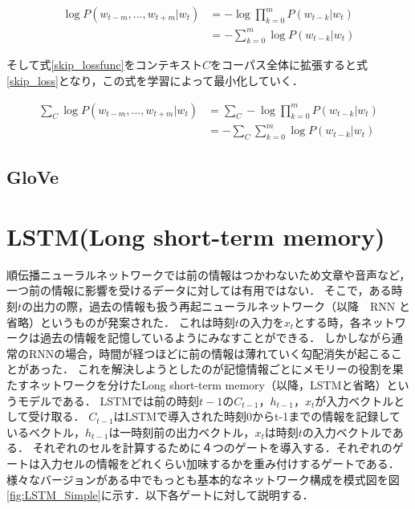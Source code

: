 \documentclass[a4j,11pt,report]{jsbook}
\begin{document}
\begin{equation}
  \label{skip_lossfunc}
  \begin{split}
    \log P(w_{t-m},...,w_{t+m}|w_{t} ) &= -\log \prod_{k = 0}^m P(w_{t-k}|w_{t})   \\
    &= - \sum_{k = 0}^m \log P(w_{t-k} | w_{t})
  \end{split}
\end{equation}

そして式\ref{skip_lossfunc}をコンテキスト$C$をコーパス全体に拡張すると式\ref{skip_loss}となり，この式を学習によって最小化していく．

\begin{equation}
  \label{skip_loss}
  \begin{split}
    \sum_{C} \log P(w_{t-m},...,w_{t+m}|w_{t} ) &= \sum_{C} -\log \prod_{k = 0}^m P(w_{t-k}|w_{t})   \\
    &= - \sum_{C} \sum_{k = 0}^m \log P(w_{t-k} | w_{t})
  \end{split}
\end{equation}




\section{GloVe \label{sec:GloVe}}
\fi


\chapter{LSTM(Long short-term memory)\label{ch:LSTM}}
順伝播ニューラルネットワークでは前の情報はつかわないため文章や音声など，一つ前の情報に影響を受けるデータに対しては有用ではない．
そこで，ある時刻$t$の出力の際，過去の情報も扱う再起ニューラルネットワーク（以降　RNN と省略）というものが発案された．
これは時刻$t$の入力を$x_{t}$とする時，各ネットワークは過去の情報を記憶しているようにみなすことができる．
しかしながら通常のRNNの場合，時間が経つほどに前の情報は薄れていく勾配消失が起こることがあった．
これを解決しようとしたのが記憶情報ごとにメモリーの役割を果たすネットワークを分けたLong short-term memory（以降，LSTMと省略）というモデルである．
LSTMでは前の時刻$t-1$の$C_{t-1}$，$h_{t-1}$，$x_{t}$が入力ベクトルとして受け取る．
$C_{t-1}$はLSTMで導入された時刻0からt-1までの情報を記録しているベクトル，$h_{t-1}$は一時刻前の出力ベクトル，$x_{t}$は時刻$t$の入力ベクトルである．
それぞれのセルを計算するために４つのゲートを導入する．それぞれのゲートは入力セルの情報をどれくらい加味するかを重み付けするゲートである．
様々なバージョンがある中でもっとも基本的なネットワーク構成を模式図を図\ref{fig:LSTM_Simple}に示す．以下各ゲートに対して説明する．
\end{document}
